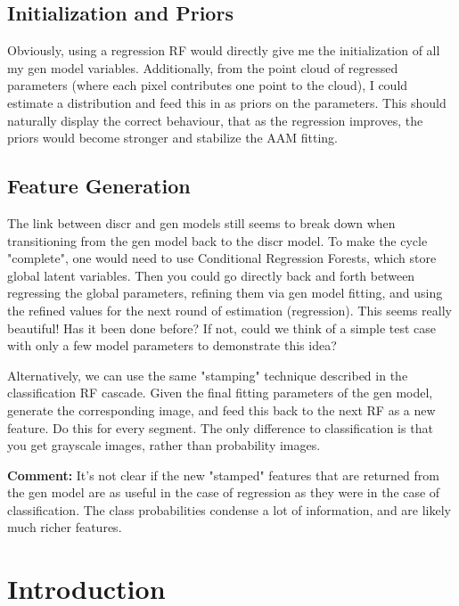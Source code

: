 \documentclass[10pt,twocolumn,letterpaper]{article}
\begin{document}
\subsection{Initialization and Priors}

Obviously, using a regression RF would directly give me the initialization of all my gen model variables.  Additionally, from the point cloud of regressed parameters (where each pixel contributes one point to the cloud), I could estimate a distribution and feed this in as priors on the parameters.  This should naturally display the correct behaviour, that as the regression improves, the priors would become stronger and stabilize the AAM fitting.

\subsection{Feature Generation}

The link between discr and gen models still seems to break down when transitioning from the gen model back to the discr model.  To make the cycle "complete", one would need to use Conditional Regression Forests, which store global latent variables. Then you could go directly back and forth between regressing the global parameters, refining them via gen model fitting, and using the refined values for the next round of estimation (regression).  This seems really beautiful!  Has it been done before?  If not, could we think of a simple test case with only a few model parameters to demonstrate this idea?

Alternatively, we can use the same "stamping" technique described in the classification RF cascade.  Given the final fitting parameters of the gen model, generate the corresponding image, and feed this back to the next RF as a new feature.  Do this for every segment.  The only difference to classification is that you get grayscale images, rather than probability images.

\textbf{Comment:} It's not clear if the new "stamped" features that are returned from the gen model are as useful in the case of regression as they were in the case of classification.  The class probabilities condense a lot of information, and are likely much richer features.









\section{Introduction}
\end{document}

